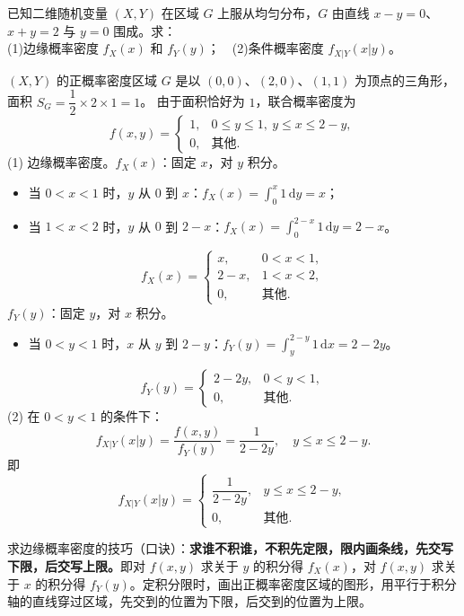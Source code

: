 ﻿\documentclass[lang=cn,11pt]{elegantbook}
\begin{document}
\begin{exercise}[三角形区域上的均匀分布] \label{exer:3-13}
已知二维随机变量 $(X,Y)$ 在区域 $G$ 上服从均匀分布，$G$ 由直线 $x-y=0$、$x+y=2$ 与 $y=0$ 围成。求：\\
(1)边缘概率密度 $f_X(x)$ 和 $f_Y(y)$；~~(2)条件概率密度 $f_{X|Y}(x|y)$。
\end{exercise}
\begin{solution}
$(X,Y)$ 的正概率密度区域 $G$ 是以 $(0,0)$、$(2,0)$、$(1,1)$ 为顶点的三角形，面积 $S_G = \dfrac{1}{2} \times 2 \times 1 = 1$。
由于面积恰好为 $1$，联合概率密度为
\[
f(x,y) = \begin{cases} 1, & 0 \leqslant y \leqslant 1,\ y \leqslant x \leqslant 2-y, \\ 0, & \text{其他}. \end{cases}
\]
(1) 边缘概率密度。$f_X(x)$：固定 $x$，对 $y$ 积分。
\begin{itemize}
    \item 当 $0 < x < 1$ 时，$y$ 从 $0$ 到 $x$：$f_X(x) = \displaystyle\int_0^x 1\,\mathrm{d}y = x$；
    \item 当 $1 < x < 2$ 时，$y$ 从 $0$ 到 $2-x$：$f_X(x) = \displaystyle\int_0^{2-x} 1\,\mathrm{d}y = 2-x$。
\end{itemize}
\[
f_X(x) = \begin{cases} x, & 0 < x < 1, \\ 2-x, & 1 < x < 2, \\ 0, & \text{其他}. \end{cases}
\]
$f_Y(y)$：固定 $y$，对 $x$ 积分。
\begin{itemize}
    \item 当 $0 < y < 1$ 时，$x$ 从 $y$ 到 $2-y$：$f_Y(y) = \displaystyle\int_y^{2-y} 1\,\mathrm{d}x = 2-2y$。
\end{itemize}
\[
f_Y(y) = \begin{cases} 2-2y, & 0 < y < 1, \\ 0, & \text{其他}. \end{cases}
\]
(2) 在 $0 < y < 1$ 的条件下：
\[
f_{X|Y}(x|y) = \frac{f(x,y)}{f_Y(y)} = \frac{1}{2-2y}, \quad y \leqslant x \leqslant 2-y.
\]
即
\[
f_{X|Y}(x|y) = \begin{cases} \dfrac{1}{2-2y}, & y \leqslant x \leqslant 2-y, \\ 0, & \text{其他}. \end{cases}
\]
\end{solution}
\begin{note}
求边缘概率密度的技巧（口诀）：\textbf{求谁不积谁，不积先定限，限内画条线，先交写下限，后交写上限。}即对 $f(x,y)$ 求关于 $y$ 的积分得 $f_X(x)$，对 $f(x,y)$ 求关于 $x$ 的积分得 $f_Y(y)$。定积分限时，画出正概率密度区域的图形，用平行于积分轴的直线穿过区域，先交到的位置为下限，后交到的位置为上限。
\end{note}
\end{document}
